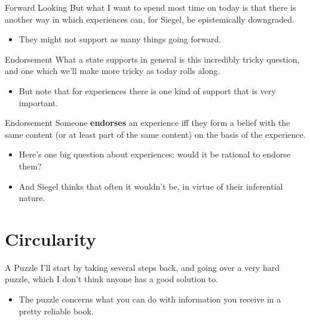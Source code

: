 \documentclass[
  17pt,
  letterpaper,
  ignorenonframetext,
  aspectratio=169,
  handout,
  xcolor={dvipsnames}]{beamer}
\providecommand{\tightlist}{%
  \setlength{\itemsep}{0pt}\setlength{\parskip}{0pt}}\usepackage{longtable,booktabs,array}
\begin{document}
\begin{frame}{Forward Looking}
\protect\hypertarget{forward-looking}{}
But what I want to spend most time on today is that there is another way
in which experiences can, for Siegel, be epistemically downgraded.

\begin{itemize}[<+->]
\tightlist
\item
  They might not support as many things going forward.
\end{itemize}
\end{frame}

\begin{frame}{Endorsement}
\protect\hypertarget{endorsement}{}
What a state supports in general is this incredibly tricky question, and
one which we'll make more tricky as today rolls along.

\begin{itemize}[<+->]
\tightlist
\item
  But note that for experiences there is one kind of support that is
  very important.
\end{itemize}
\end{frame}

\begin{frame}{Endorsement}
\protect\hypertarget{endorsement-1}{}
Someone \textbf{endorses} an experience iff they form a belief with the
same content (or at least part of the same content) on the basis of the
experience.

\begin{itemize}[<+->]
\tightlist
\item
  Here's one big question about experiences: would it be rational to
  endorse them?
\item
  And Siegel thinks that often it wouldn't be, in virtue of their
  inferential nature.
\end{itemize}
\end{frame}

\hypertarget{circularity}{%
\section{Circularity}\label{circularity}}

\begin{frame}{A Puzzle}
\protect\hypertarget{a-puzzle}{}
I'll start by taking several steps back, and going over a very hard
puzzle, which I don't think anyone has a good solution to.

\begin{itemize}[<+->]
\tightlist
\item
  The puzzle concerns what you can do with information you receive in a
  pretty reliable book.
\end{itemize}
\end{frame}
\end{document}
